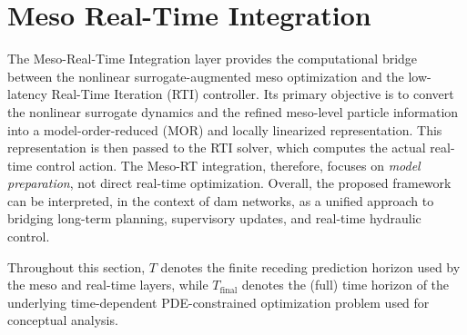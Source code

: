 \documentclass{article}
\newcommand{\1}{\mathds{1}}          %
\theoremstyle{definition}
\begin{document}
\begin{sloppypar}


\section{Meso Real-Time Integration}

The Meso-Real-Time Integration layer provides the computational bridge between the 
nonlinear surrogate-augmented meso optimization and the low-latency Real-Time Iteration (RTI) controller. Its primary objective is to convert the nonlinear surrogate dynamics and the refined meso-level particle information into a model-order-reduced (MOR) and locally linearized representation. This representation is then passed to the RTI solver, which computes the actual real-time control action. The Meso-RT integration, therefore, focuses on \emph{model preparation}, not direct real-time optimization. Overall, the proposed framework can be interpreted, in the context of dam networks, as a unified approach to bridging long-term planning, supervisory updates, and real-time hydraulic control.

Throughout this section, $T$ denotes the finite receding prediction horizon
used by the meso and real-time layers, while $T_{\mathrm{final}}$ denotes the
(full) time horizon of the underlying time-dependent PDE-constrained
optimization problem used for conceptual analysis.




\end{sloppypar}
\end{document}
